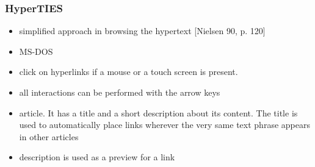 \begin{frame}
\frametitle{HyperTIES}
\begin{itemize}
	\item simplified approach in browsing the hypertext [Nielsen 90, p. 120]
	\item MS-DOS
	\item click on hyperlinks if a mouse or a touch screen is present.
	\item all interactions can be performed with the arrow keys
	\item article. It has a title and a short description about its content. The title is used to automatically place links wherever the very same text phrase appears in other articles
	\item description is used as a preview for a link
\end{itemize}

\end{frame}

